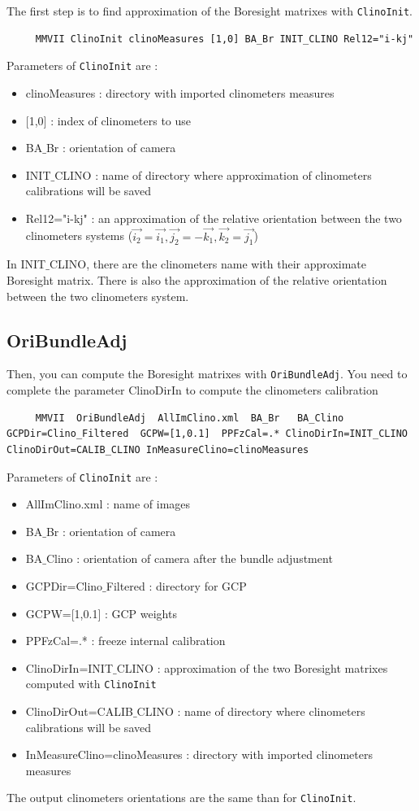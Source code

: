 The first step is to find approximation of the Boresight matrixes with {\tt ClinoInit}.

\begin{lstlisting}
     MMVII ClinoInit clinoMeasures [1,0] BA_Br INIT_CLINO Rel12="i-kj"
\end{lstlisting}


Parameters of {\tt ClinoInit} are :
\begin{itemize}
     \item clinoMeasures : directory with imported clinometers measures
     \item $[$1,0$]$ : index of clinometers to use
     \item BA$\_$Br : orientation of camera
     \item INIT$\_$CLINO : name of directory where approximation of clinometers calibrations will be saved
     \item Rel12="i-kj" : an approximation of the relative orientation between the two clinometers systems ($\Vec{i_2}=\Vec{i_1}, \Vec{j_2}=-\Vec{k_1}, \Vec{k_2}=\Vec{j_1}$)
\end{itemize}

In INIT$\_$CLINO, there are the clinometers name with their approximate Boresight matrix. There is also the approximation of the relative orientation between the two clinometers system.



\subsection{OriBundleAdj}

Then, you can compute the Boresight matrixes with {\tt OriBundleAdj}. You need to complete the parameter ClinoDirIn to compute the clinometers calibration

\begin{lstlisting}
     MMVII  OriBundleAdj  AllImClino.xml  BA_Br   BA_Clino   GCPDir=Clino_Filtered  GCPW=[1,0.1]  PPFzCal=.* ClinoDirIn=INIT_CLINO ClinoDirOut=CALIB_CLINO InMeasureClino=clinoMeasures
\end{lstlisting}

Parameters of {\tt ClinoInit} are :
\begin{itemize}
     \item AllImClino.xml : name of images
     \item BA$\_$Br : orientation of camera
     \item BA$\_$Clino : orientation of camera after the bundle adjustment
     \item GCPDir=Clino$\_$Filtered : directory for GCP
     \item GCPW=[1,0.1] : GCP weights
     \item PPFzCal=.* : freeze internal calibration
     \item ClinoDirIn=INIT$\_$CLINO : approximation of the two Boresight matrixes computed with {\tt ClinoInit}
     \item ClinoDirOut=CALIB$\_$CLINO : name of directory where clinometers calibrations will be saved
     \item InMeasureClino=clinoMeasures : directory with imported clinometers measures
\end{itemize}

The output clinometers orientations are the same than for {\tt ClinoInit}.
